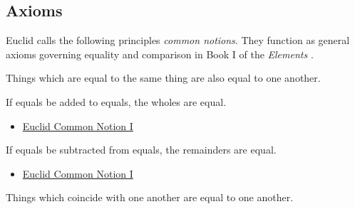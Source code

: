 \subsection*{Axioms}

Euclid calls the following principles \textit{common notions}. They function as
general axioms governing equality and comparison in Book I of the
\textit{Elements} \citep[Book I, Common Notions 1--5]{euclid-elements-heath}.

\begin{axiom}
\label{ax-euclid-common-notion-things-equal-to-same}
Things which are equal to the same thing are also equal to one another.
\end{axiom}
\begin{lra-not-visible}
\NoLocalDependencies
\end{lra-not-visible}

\begin{axiom}
\label{ax-euclid-common-notion-add-equals}
If equals be added to equals, the wholes are equal.
\end{axiom}
\begin{lra-not-visible}
\begin{dependencies}
\begin{itemize}
  \item \hyperref[ax-euclid-common-notion-things-equal-to-same]{Euclid Common Notion I}
\end{itemize}
\end{dependencies}
\end{lra-not-visible}

\begin{axiom}
\label{ax-euclid-common-notion-subtract-equals}
If equals be subtracted from equals, the remainders are equal.
\end{axiom}
\begin{lra-not-visible}
\begin{dependencies}
\begin{itemize}
  \item \hyperref[ax-euclid-common-notion-things-equal-to-same]{Euclid Common Notion I}
\end{itemize}
\end{dependencies}
\end{lra-not-visible}

\begin{axiom}
\label{ax-euclid-common-notion-coinciding-things-equal}
Things which coincide with one another are equal to one another.
\end{axiom}
\begin{lra-not-visible}
\NoLocalDependencies
\end{lra-not-visible}

